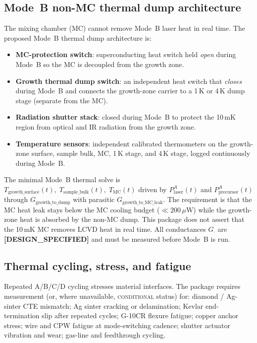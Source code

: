 \documentclass[12pt,a4paper]{article}
\newcommand{\conditional}{\textsc{conditional}}
\newcommand{\designspec}{\textbf{[DESIGN\_SPECIFIED]}}
\begin{document}
\subsection{Mode~B non-MC thermal dump architecture}
\label{sec:mode_b_thermal_dump}
The mixing chamber (MC) cannot remove Mode~B laser heat in real time. The
proposed Mode~B thermal dump architecture is:
\begin{itemize}[noitemsep]
  \item \textbf{MC-protection switch}: superconducting heat switch held
        \emph{open} during Mode~B so the MC is decoupled from the growth zone.
  \item \textbf{Growth thermal dump switch}: an independent heat switch that
        \emph{closes} during Mode~B and connects the growth-zone carrier to a
        1\,K or 4\,K dump stage (separate from the MC).
  \item \textbf{Radiation shutter stack}: closed during Mode~B to protect the
        10\,mK region from optical and IR radiation from the growth zone.
  \item \textbf{Temperature sensors}: independent calibrated thermometers on the
        growth-zone surface, sample bulk, MC, 1\,K stage, and 4\,K stage,
        logged continuously during Mode~B.
\end{itemize}
The minimal Mode~B thermal solve is
$T_{\mathrm{growth\_surface}}(t),\;T_{\mathrm{sample\_bulk}}(t),\;T_{\mathrm{MC}}(t)$
driven by $P_{\mathrm{laser}}^A(t)$ and $P_{\mathrm{precursor}}^A(t)$ through
$G_{\mathrm{growth\_to\_dump}}$ with parasitic $G_{\mathrm{growth\_to\_MC\_leak}}$.
The requirement is that the MC heat leak stays below the MC cooling budget
($\ll 200\,\mu$W) while the growth-zone heat is absorbed by the non-MC dump.
This package does not assert that the 10\,mK MC removes LCVD heat in real time.
All conductances $G_{\cdot}$ are \designspec{} and must be measured before
Mode~B is run.

\subsection{Thermal cycling, stress, and fatigue}
\label{sec:cycling}
Repeated A/B/C/D cycling stresses material interfaces. The package requires
measurement (or, where unavailable, \conditional{} status) for:
diamond / Ag-sinter CTE mismatch;
Ag sinter cracking or delamination;
Kevlar end-termination slip after repeated cycles;
G-10CR flexure fatigue;
copper anchor stress;
wire and CPW fatigue at mode-switching cadence;
shutter actuator vibration and wear;
gas-line and feedthrough cycling.
\end{document}
